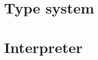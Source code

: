 \documentclass[12pt,a4paper,twoside]{article}
\theoremstyle{definition} %
\newtheorem{definicija}{Definicija}[section]
\newtheorem{primer}[definicija]{Primer}
\theoremstyle{plain} %
\newtheorem{trditev}[definicija]{Trditev}
\numberwithin{equation}{section}  %
\begin{document}
\section{Type system}

\section{Interpreter}

%


%
\end{document}
